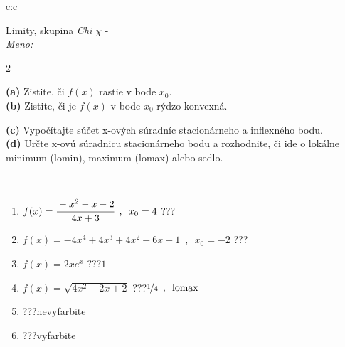 \documentclass[10pt]{report}
\begin{document}
\begin{tabular}{c:c}
\begin{minipage}[c][104.5mm][t]{0.5\linewidth}
\begin{center}
\vspace{7mm}
{\huge Limity, skupina \textit{Chi $\chi$} -}\\[5mm]
\textit{Meno:}\phantom{xxxxxxxxxxxxxxxxxxxxxxxxxxxxxxxxxxxxxxxxxxxxxxxxxxxxxxxxxxxxxxxxx}\\[5mm]
\begin{minipage}{0.95\linewidth}
\begin{center}
{\small \begin{multicols}{2} \raggedright
\textbf{(a)} Zistite, či \(f(x)\) rastie v bode \(x_0\). \\[1mm]
\textbf{(b)} Zistite, či je \(f(x)\) v bode \(x_0\) rýdzo konvexná. \par \columnbreak
\textbf{(c)} Vypočítajte súčet x-ových súradníc stacionárneho a inflexného bodu. \\[1mm]
\textbf{(d)} Určte x-ovú súradnicu stacionárneho bodu a rozhodnite, či ide o lokálne minimum (lomin), maximum (lomax) alebo sedlo. \\[1mm]
\end{multicols}
}
\end{center}
\end{minipage}
\\[4mm]
\begin{minipage}{0.79\linewidth}
\begin{center}
\begin{varwidth}{\linewidth}
\begin{enumerate}
\normalsize
\item $f(x)=\cfrac{-x^2-x-2}{4x+3}\enspace , \enspace x_0=4$\quad \dotfill\; ???\;\dotfill \quad {}
\item $f(x)=-4x^4+4x^3+4x^2-6x+1\enspace , \enspace x_0=-2$\quad \dotfill\; ???\;\dotfill \quad {}
\item $f(x)=2xe^{x}$\quad \dotfill\; ???\;\dotfill \quad $1$
\item $f(x)=\sqrt{4x^2-2x+2}$\quad \dotfill\; ???\;\dotfill \quad $\nicefrac{1}{4}\enspace , \enspace\text{lomax}$
\item \quad \dotfill\; ???\;\dotfill \quad nevyfarbite
\item \quad \dotfill\; ???\;\dotfill \quad vyfarbite
\end{enumerate}
\end{varwidth}
\end{center}

\end{minipage}
\end{center}
\end{minipage}
\end{tabular}
\end{document}
